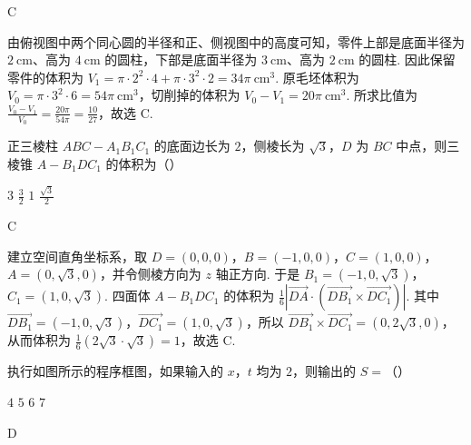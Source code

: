 \begin{answer}
C
\end{answer}

\begin{solution}
由俯视图中两个同心圆的半径和正、侧视图中的高度可知，零件上部是底面半径为 \(2\mathrm{~cm}\)、高为 \(4\mathrm{~cm}\) 的圆柱，下部是底面半径为 \(3\mathrm{~cm}\)、高为 \(2\mathrm{~cm}\) 的圆柱. 因此保留零件的体积为
\(V_1=\pi\cdot2^2\cdot4+\pi\cdot3^2\cdot2=34\pi\mathrm{~cm}^3\).
原毛坯体积为 \(V_0=\pi\cdot3^2\cdot6=54\pi\mathrm{~cm}^3\)，切削掉的体积为 \(V_0-V_1=20\pi\mathrm{~cm}^3\). 所求比值为
\(\displaystyle\frac{V_0-V_1}{V_0}=\frac{20\pi}{54\pi}=\frac{10}{27}\)，故选 C.
\end{solution}

\begin{problem}
正三棱柱 \(ABC-A_1B_1C_1\) 的底面边长为 \(2\)，侧棱长为 \(\sqrt{3}\)，\(D\) 为 \(BC\) 中点，则三棱锥 \(A-B_1DC_1\) 的体积为（\quad）

\choices
    {\(3\)}
    {\(\frac{3}{2}\)}
    {\(1\)}
    {\(\frac{\sqrt{3}}{2}\)}
\end{problem}

\begin{answer}
C
\end{answer}

\begin{solution}
建立空间直角坐标系，取 \(D=(0,0,0)\)，\(B=(-1,0,0)\)，\(C=(1,0,0)\)，\(A=(0,\sqrt3,0)\)，并令侧棱方向为 \(z\) 轴正方向. 于是 \(B_1=(-1,0,\sqrt3)\)，\(C_1=(1,0,\sqrt3)\).
四面体 \(A-B_1DC_1\) 的体积为
\(\displaystyle\frac{1}{6}\left|\overrightarrow{DA}\cdot\left(\overrightarrow{DB_1}\times\overrightarrow{DC_1}\right)\right|\).
其中 \(\overrightarrow{DB_1}=(-1,0,\sqrt3)\)，\(\overrightarrow{DC_1}=(1,0,\sqrt3)\)，所以 \(\overrightarrow{DB_1}\times\overrightarrow{DC_1}=(0,2\sqrt3,0)\)，从而体积为 \(\frac{1}{6}(2\sqrt3\cdot\sqrt3)=1\)，故选 C.
\end{solution}

\begin{problem}
执行如图所示的程序框图，如果输入的 \(x\)，\(t\) 均为 \(2\)，则输出的 \(S=\)（\quad）

\FloatBarrier

\choices
    {\(4\)}
    {\(5\)}
    {\(6\)}
    {\(7\)}
\end{problem}

\begin{answer}
D
\end{answer}

